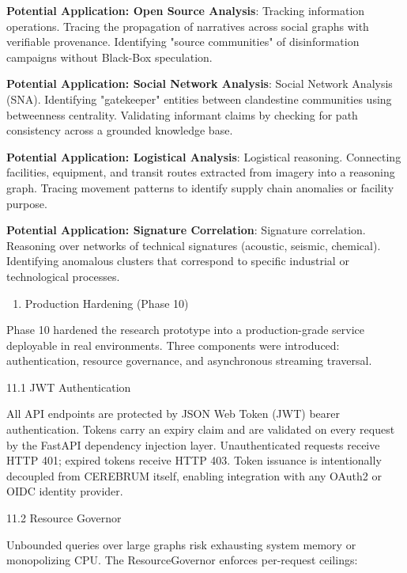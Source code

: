 \documentclass[10pt,journal,compsoc]{IEEEtran}
\begin{document}
\textbf{Potential Application: Open Source Analysis}: Tracking information operations. Tracing the propagation of narratives across social graphs with verifiable provenance. Identifying "source communities" of disin\-formation campaigns without Black-Box speculation.

\textbf{Potential Application: Social Network Analysis}: Social Network Analysis (SNA). Identifying "gatekeeper" entities between clandestine communities using betweenness centrality. Validating informant claims by checking for path consistency across a grounded knowledge base.

\textbf{Potential Application: Logistical Analysis}: Logistical reasoning. Connecting facilities, equipment, and transit routes extracted from imagery into a reasoning graph. Tracing movement patterns to identify supply chain anomalies or facility purpose.

\textbf{Potential Application: Signature Correlation}: Signature correlation. Reasoning over networks of technical signatures (acoustic, seismic, chemical). Identifying anomalous clusters that correspond to specific industrial or techn\-ological processes.

\begin{enumerate}
\item Production Hardening (Phase 10)

\end{enumerate}
Phase 10 hardened the research prototype into a production-grade service deployable in real envir\-onments. Three components were introduced: authe\-ntication, resource governance, and async\-hronous streaming traversal.

11.1 JWT Authen\-tication

All API endpoints are protected by JSON Web Token (JWT) bearer authe\-ntication. Tokens carry an expiry claim and are validated on every request by the FastAPI dependency injection layer. Unauth\-enticated requests receive HTTP 401; expired tokens receive HTTP 403. Token issuance is inten\-tionally decoupled from CEREBRUM itself, enabling integration with any OAuth2 or OIDC identity provider.

11.2 Resource Governor

Unbounded queries over large graphs risk exhausting system memory or monop\-olizing CPU. The ResourceGovernor enforces per-request ceilings:
\end{document}
